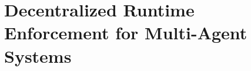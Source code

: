 

\newcommand*{\defeq}{\stackrel{\text{def}}{=}}
\newcommand{\Agents}{\mathcal{U}}
\newcommand{\Time}{\mathbb{T}}
\newcommand{\Actions}{\Sigma} 
\newcommand{\Elabel}{\mathcal{Y}}
\newcommand{\Vlabel}{\mathcal{X}}
\newcommand{\Bool}{\mathbb{B}}
\newcommand{\Safety}{\varphi}
\newcommand{\Lang}{\mathcal{L}}
\newcommand{\Power}{\mathcal{P}}
\newcommand{\Replace}{\mathcal{R}}
\newcommand\dhrightarrow{%
  \mathrel{\ooalign{$\rightarrow$\cr%
  $\mkern3.5mu\rightarrow$}}
}
\newcommand\dhxrightarrow[2][]{%
  \mathrel{\ooalign{$\xrightarrow[#1\mkern4mu]{#2\mkern4mu}$\cr%
  \hidewidth$\rightarrow\mkern4mu$}}
}

\newcommand{\Dj}[1]{\textcolor{blue}{#1}}
\newcommand{\suda}[1]{\textcolor{red}{#1}}

\newcommand\Square[1]{+(-#1,-#1) rectangle +(#1,#1)}

\chapter{Decentralized Runtime Enforcement for Multi-Agent Systems}










